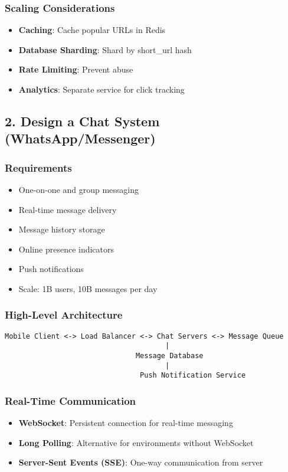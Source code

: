 \documentclass[10pt,a4paper]{article}
\begin{document}
\subsubsection{Scaling Considerations}
\begin{itemize}
\item \textbf{Caching}: Cache popular URLs in Redis
\item \textbf{Database Sharding}: Shard by short\_url hash
\item \textbf{Rate Limiting}: Prevent abuse
\item \textbf{Analytics}: Separate service for click tracking
\end{itemize}

\subsection{2. Design a Chat System (WhatsApp/Messenger)}

\subsubsection{Requirements}
\begin{itemize}
\item One-on-one and group messaging
\item Real-time message delivery
\item Message history storage
\item Online presence indicators
\item Push notifications
\item Scale: 1B users, 10B messages per day
\end{itemize}

\subsubsection{High-Level Architecture}
\begin{verbatim}
Mobile Client <-> Load Balancer <-> Chat Servers <-> Message Queue
                                      |
                               Message Database
                                      |
                                Push Notification Service
\end{verbatim}

\subsubsection{Real-Time Communication}
\begin{itemize}
\item \textbf{WebSocket}: Persistent connection for real-time messaging
\item \textbf{Long Polling}: Alternative for environments without WebSocket
\item \textbf{Server-Sent Events (SSE)}: One-way communication from server
\end{itemize}
\end{document}
